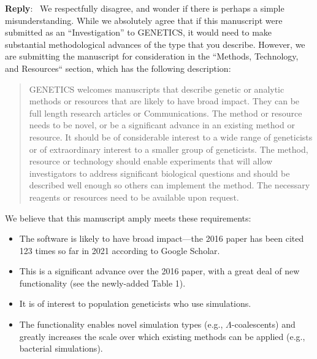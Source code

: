 \documentclass[11pt]{article}
\newenvironment{reply}
   {\medskip \noindent \begin{sf}\textbf{Reply}:\  }
   {\medskip \end{sf}}
\begin{document}
\begin{reply}
We respectfully disagree, and wonder if there is perhaps a simple
misunderstanding. While we absolutely agree that if this
manuscript were submitted as an ``Investigation'' to GENETICS,
it would need to make substantial methodological
advances of the type that you describe. However, we are submitting
the manuscript for consideration in the ``Methods, Technology, and Resources``
section, which has the following description:

\begin{quotation}
GENETICS welcomes manuscripts that describe genetic or analytic methods or
resources that are likely to have broad impact. They can be full length
research articles or Communications. The method or resource needs to be novel,
or be a significant advance in an existing method or resource. It should be of
considerable interest to a wide range of geneticists or of extraordinary
interest to a smaller group of geneticists. The method, resource or technology
should enable experiments that will allow investigators to address significant
biological questions and should be described well enough so others can
implement the method. The necessary reagents or resources need to be available
upon request.
\end{quotation}

We believe that this manuscript amply meets these requirements:

\begin{itemize}
\item The software is likely to have broad impact---the 2016 paper has
been cited 123 times so far in 2021 according to Google Scholar.
\item This is a significant advance over the 2016 paper, with a great deal of
new functionality (see the newly-added Table 1).
\item It is of interest to population geneticists who use simulations.
\item The functionality enables novel simulation types (e.g.,
$\Lambda$-coalescents) and greatly increases the scale over which
existing methods can be applied (e.g., bacterial simulations).
\end{itemize}

\end{reply}
\end{document}
